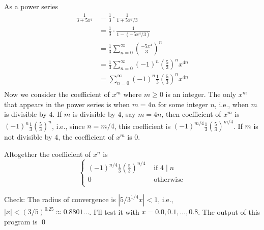 As a power series
\begin{align*}
\frac{1}{3 + 5x^4}
&= \frac{1}{3} \cdot \frac{1}{1 + 5x^4/3} \\
&= \frac{1}{3} \cdot \frac{1}{1 - (-5x^4/3)} \\
&= \frac{1}{3} \sum_{n=0}^\infty \left( \frac{-5x^4}{3} \right)^n \\
&= \frac{1}{3} \sum_{n=0}^\infty (-1)^n \left(\frac{5}{3}\right)^n x^{4n} \\
&= \sum_{n=0}^\infty (-1)^n \frac{1}{3} \left(\frac{5}{3}\right)^n x^{4n} \\
\end{align*}
Now we consider the coefficient of $x^m$ where $m \geq 0$ is an integer.
The only $x^m$ that appears in the power series is when $m = 4n$ for some integer $n$, i.e., when
$m$ is divisible by $4$.
If $m$ is divisible by $4$, say $m = 4n$, then coefficient of $x^m$ is 
$\displaystyle (-1)^n \frac{1}{3} \left(\frac{5}{3}\right)^n$, i.e., since
$n = m/4$, this coefficient is
$\displaystyle(-1)^{m/4} \frac{1}{3} \left(\frac{5}{3}\right)^{m/4}$.
If $m$ is not divisible by $4$, the coefficient of $x^m$ is $0$.

Altogether the coefficient of $x^n$ is
\[
\begin{cases}
\displaystyle (-1)^{n/4} \frac{1}{3} \left(\frac{5}{3}\right)^{n/4} & \text{ if } 4 \mid n \\
0 & \text{ otherwise} \\
\end{cases}
\]

Check:
The radius of convergence is 
$|5/3^{1/4}x| < 1$, i.e.,
$|x| < (3/5)^{0.25} \approx 0.8801...$.
I'll test it with $x = 0.0, 0.1, ..., 0.8$.
The output of this program
is
\qed
